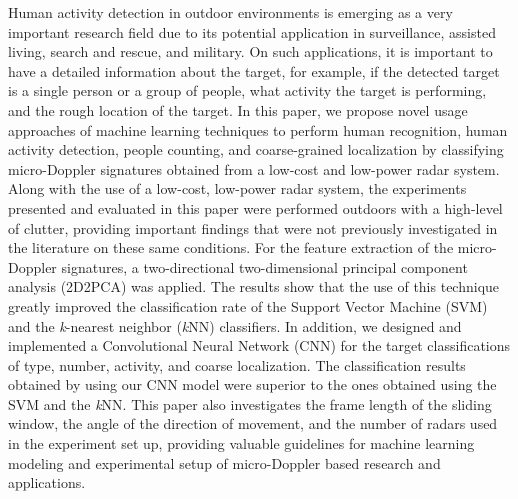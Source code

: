 Human activity detection in outdoor environments is emerging as a very important research field due to its potential application in surveillance, assisted living, search and rescue, and military. On such applications, it is important to have a detailed information about the target, for example, if the detected target is a single person or a group of people, what activity the target is performing, and the rough location of the target. In this paper, we propose novel usage approaches of machine learning techniques to perform human recognition, human activity detection, people counting, and coarse-grained localization by classifying micro-Doppler signatures obtained from a low-cost and low-power radar system. Along with the use of a low-cost, low-power radar system, the experiments presented and evaluated in this paper were performed outdoors with a high-level of clutter, providing important findings that were not previously investigated in the literature on these same conditions. For the feature extraction of the micro-Doppler signatures, a two-directional two-dimensional principal component analysis (2D2PCA) was applied. The results show that the use of this technique greatly improved the classification rate of the Support Vector Machine (SVM) and the \textit{k}-nearest neighbor (\textit{k}NN) classifiers. In addition, we designed and implemented a Convolutional Neural Network (CNN) for the target classifications of type, number, activity, and coarse localization. The classification results obtained by using our CNN model were superior to the ones obtained using the SVM and the \textit{k}NN. This paper also investigates the frame length of the sliding window, the angle of the direction of movement, and the number of radars used in the experiment set up, providing valuable guidelines for machine learning modeling and experimental setup of micro-Doppler based research and applications.